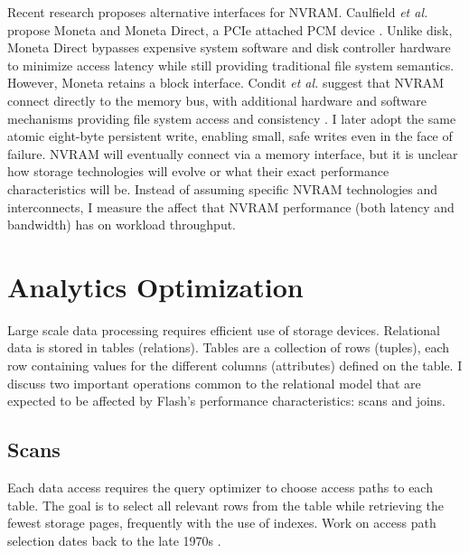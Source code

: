 Recent research proposes alternative interfaces for NVRAM.
Caulfield \emph{et al.} propose Moneta and Moneta Direct, a PCIe attached PCM device \cite{CaulfieldMollov12}.
Unlike disk, Moneta Direct bypasses expensive system software and disk controller hardware to minimize access latency while still providing traditional file system semantics.
However, Moneta retains a block interface.
Condit \emph{et al.} suggest that NVRAM connect directly to the memory bus, with additional hardware and software mechanisms providing file system access and consistency \cite{ConditNightingale09}.
I later adopt the same atomic eight-byte persistent write, enabling small, safe writes even in the face of failure.
NVRAM will eventually connect via a memory interface, but it is unclear how storage technologies will evolve or what their exact performance characteristics will be.
Instead of assuming specific NVRAM technologies and interconnects, I measure the affect that NVRAM performance (both latency and bandwidth) has on workload throughput.

\section{Analytics Optimization}
\label{sec:Background:Analytics}

Large scale data processing requires efficient use of storage devices.
Relational data is stored in tables (relations).
Tables are a collection of rows (tuples), each row containing values for the different columns (attributes) defined on the table.
I discuss two important operations common to the relational model that are expected to be affected by Flash's performance characteristics: scans and joins.

\subsection{Scans}
\label{sec:Background:Scans}

Each data access requires the query optimizer to choose access paths to each table. 
The goal is to select all relevant rows from the table while retrieving the fewest storage pages, frequently with the use of indexes.
Work on access path selection dates back to the late 1970s \cite{Selinger1979}.

